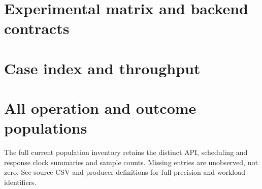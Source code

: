 \documentclass[11pt,a4paper]{article}
\begin{document}
\section{Experimental matrix and backend contracts}\label{app:matrix}


\section{Case index and throughput}\label{app:cases}

\section{All operation and outcome populations}\label{app:latencies}
The full current population inventory retains the distinct API, scheduling and response clock summaries and sample counts. Missing entries are unobserved, not zero. See source CSV and producer definitions for full precision and workload identifiers.

\end{document}
